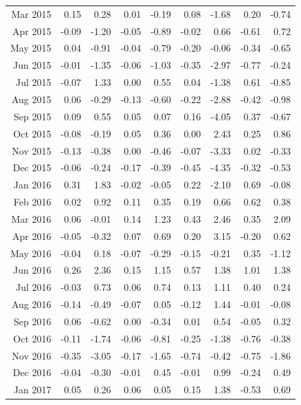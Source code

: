 \begin{tabularx}{\textwidth}{rrrrrrrrr}
  Mar 2015 & 0.15 & 0.28 & 0.01 & -0.19 & 0.08 & -1.68 & 0.20 & -0.74 \\ 
  Apr 2015 & -0.09 & -1.20 & -0.05 & -0.89 & -0.02 & 0.66 & -0.61 & 0.72 \\ 
  May 2015 & 0.04 & -0.91 & -0.04 & -0.79 & -0.20 & -0.06 & -0.34 & -0.65 \\ 
  Jun 2015 & -0.01 & -1.35 & -0.06 & -1.03 & -0.35 & -2.97 & -0.77 & -0.24 \\ 
  Jul 2015 & -0.07 & 1.33 & 0.00 & 0.55 & 0.04 & -1.38 & 0.61 & -0.85 \\ 
  Aug 2015 & 0.06 & -0.29 & -0.13 & -0.60 & -0.22 & -2.88 & -0.42 & -0.98 \\ 
  Sep 2015 & 0.09 & 0.55 & 0.05 & 0.07 & 0.16 & -4.05 & 0.37 & -0.67 \\ 
  Oct 2015 & -0.08 & -0.19 & 0.05 & 0.36 & 0.00 & 2.43 & 0.25 & 0.86 \\ 
  Nov 2015 & -0.13 & -0.38 & 0.00 & -0.46 & -0.07 & -3.33 & 0.02 & -0.33 \\ 
  Dec 2015 & -0.06 & -0.24 & -0.17 & -0.39 & -0.45 & -4.35 & -0.32 & -0.53 \\ 
  Jan 2016 & 0.31 & 1.83 & -0.02 & -0.05 & 0.22 & -2.10 & 0.69 & -0.08 \\ 
  Feb 2016 & 0.02 & 0.92 & 0.11 & 0.35 & 0.19 & 0.66 & 0.62 & 0.38 \\ 
  Mar 2016 & 0.06 & -0.01 & 0.14 & 1.23 & 0.43 & 2.46 & 0.35 & 2.09 \\ 
  Apr 2016 & -0.05 & -0.32 & 0.07 & 0.69 & 0.20 & 3.15 & -0.20 & 0.62 \\ 
  May 2016 & -0.04 & 0.18 & -0.07 & -0.29 & -0.15 & -0.21 & 0.35 & -1.12 \\ 
  Jun 2016 & 0.26 & 2.36 & 0.15 & 1.15 & 0.57 & 1.38 & 1.01 & 1.38 \\ 
  Jul 2016 & -0.03 & 0.73 & 0.06 & 0.74 & 0.13 & 1.11 & 0.40 & 0.24 \\ 
  Aug 2016 & -0.14 & -0.49 & -0.07 & 0.05 & -0.12 & 1.44 & -0.01 & -0.08 \\ 
  Sep 2016 & 0.06 & -0.62 & 0.00 & -0.34 & 0.01 & 0.54 & -0.05 & 0.32 \\ 
  Oct 2016 & -0.11 & -1.74 & -0.06 & -0.81 & -0.25 & -1.38 & -0.76 & -0.38 \\ 
  Nov 2016 & -0.35 & -3.05 & -0.17 & -1.65 & -0.74 & -0.42 & -0.75 & -1.86 \\ 
  Dec 2016 & -0.04 & -0.30 & -0.01 & 0.45 & -0.01 & 0.99 & -0.24 & 0.49 \\ 
  Jan 2017 & 0.05 & 0.26 & 0.06 & 0.05 & 0.15 & 1.38 & -0.53 & 0.69 \\ 

\end{tabularx}

